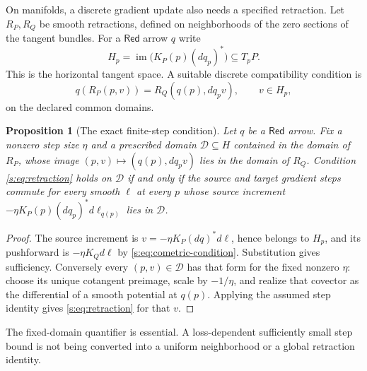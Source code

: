 \documentclass[11pt]{article}
\newtheorem{proposition}[theorem]{Proposition}
\theoremstyle{definition}
\theoremstyle{remark}\newtheorem{remark}[theorem]{Remark}
\newcommand{\im}{\operatorname{im}}
\newcommand{\Red}{\mathsf{Red}}
\begin{document}
On manifolds, a discrete gradient update also needs a specified retraction.
Let $R_P,R_Q$ be smooth retractions, defined on neighborhoods of the zero
sections of the tangent bundles. For a $\Red$ arrow $q$ write
\[
 H_p=\im\bigl(K_P(p)(dq_p)^*\bigr)\subseteq T_pP.
\]
This is the horizontal tangent space. A suitable discrete compatibility
condition is
\begin{equation}\label{s:eq:retraction}
 q(R_P(p,v))=R_Q(q(p),dq_pv),\qquad v\in H_p,
\end{equation}
on the declared common domains.

\begin{proposition}[The exact finite-step condition]
\label{s:prop:retraction}
Let $q$ be a $\Red$ arrow. Fix a nonzero step size $\eta$ and a prescribed
domain $\mathcal D\subseteq H$ contained in the domain of $R_P$, whose
image $(p,v)\mapsto(q(p),dq_pv)$ lies in the domain of $R_Q$.
Condition \eqref{s:eq:retraction} holds on $\mathcal D$ if and only if
the source and target gradient steps commute for every smooth $\ell$ at
every $p$ whose source increment
$-\eta K_P(p)(dq_p)^*d\ell_{q(p)}$ lies in $\mathcal D$.
\end{proposition}
\begin{proof}
The source increment is
$v=-\eta K_P(dq)^*d\ell$, hence belongs to $H_p$, and its pushforward is
$-\eta K_Qd\ell$ by \eqref{s:eq:cometric-condition}. Substitution gives
sufficiency. Conversely every $(p,v)\in\mathcal D$ has that form for the
fixed nonzero $\eta$: choose its unique cotangent preimage, scale by
$-1/\eta$, and realize that covector as the differential of a smooth
potential at $q(p)$. Applying the assumed step identity gives
\eqref{s:eq:retraction} for that $v$.
\end{proof}
The fixed-domain quantifier is essential. A loss-dependent sufficiently
small step bound is not being converted into a uniform neighborhood or a
global retraction identity.
\end{document}
